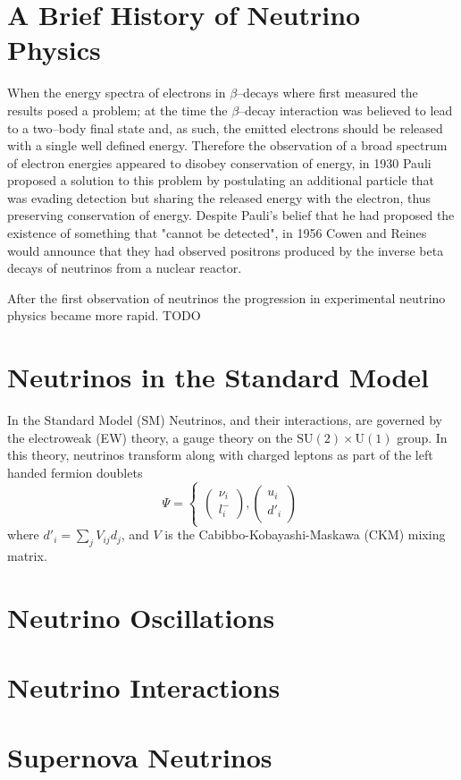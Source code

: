 \section{A Brief History of Neutrino Physics} \label{nu_sm}

When the energy spectra of electrons in \(\beta\)--decays where first measured
the results posed a problem; at the time the \(\beta\)--decay interaction was
believed to lead to a two--body final state and, as such, the emitted electrons
should be released with a single well defined energy. Therefore the observation
of a broad spectrum of electron energies appeared to disobey conservation of
energy, in 1930 Pauli proposed a solution to this problem by postulating an 
additional particle that was evading detection but sharing the released energy 
with the electron, thus preserving conservation of energy. Despite Pauli's 
belief that he had proposed the existence of something that "cannot be 
detected", in 1956 Cowen and Reines would announce that they had observed 
positrons produced by the inverse beta decays of neutrinos from a nuclear 
reactor. 

After the first observation of neutrinos the progression in experimental 
neutrino physics became more rapid. TODO

\section{Neutrinos in the Standard Model} \label{nu_sm}

In the Standard Model (SM) Neutrinos, and their interactions, are governed by 
the electroweak (EW) theory, a gauge theory on the \(\mbox{SU}(2) \times 
\mbox{U}(1)\) group. In this theory, neutrinos transform along with charged 
leptons as part of the left handed fermion doublets
\begin{equation}
	\Psi = 
	\begin{cases} 
		\left( \begin{array}{c} \nu_i \\ l^-_i \end{array} \right), \left( 
			\begin{array}{c} u_i \\ d'_i \end{array} \right)
	\end{cases}
\end{equation}
where \(d'_i = \sum_j V_{ij} d_j\), and \(V\) is the Cabibbo-Kobayashi-Maskawa 
(CKM) mixing matrix.

\section{Neutrino Oscillations} \label{nu_osc}


\section{Neutrino Interactions} \label{nu_prod}


\section{Supernova Neutrinos} \label{nu_sn}

